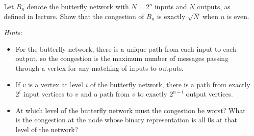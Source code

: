 \documentclass[twoside,12pt]{article}
\begin{document}
\begin{problem}[20 points]
Let $B_n$ denote the butterfly network with $N=2^n$ inputs and $N$
outputs, as defined in lecture. Show that the congestion of $B_n$ is
exactly $\sqrt{N}$ when $n$ is even.


\emph{Hints:}
\begin{itemize}
\item For the butterfly network, there is a unique path from
each input to each output, so the congestion is the maximum number
of messages passing through a vertex for any matching of inputs to
outputs.
\item If $v$ is a vertex at level $i$ of the butterfly
network, there is a path from exactly $2^i$ input vertices to $v$
and a path from $v$ to exactly $2^{n-i}$ output vertices.\\
\item At which level of the butterfly network must the congestion be
worst? What is the congestion at the node whose binary
representation is all $0$s at that level of the network?
\end{itemize}

\end{problem}
\end{document}
